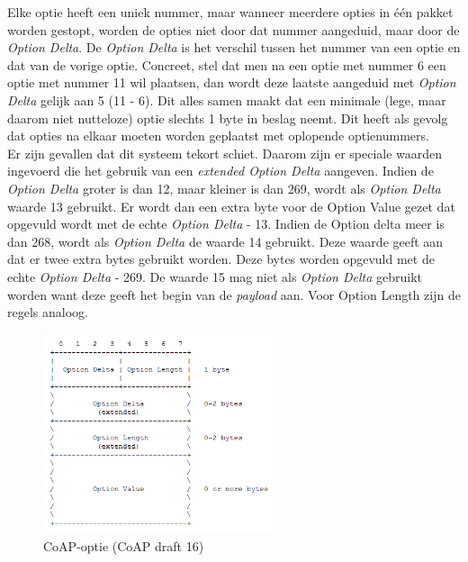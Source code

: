 Elke optie heeft een uniek nummer, maar wanneer meerdere opties in \'{e}\'{e}n pakket worden gestopt, worden de opties niet door dat nummer aangeduid, maar door de \textit{Option Delta}. De \textit{Option Delta} is het verschil tussen het nummer van een optie en dat van de vorige optie.
Concreet, stel dat men na een optie met nummer 6 een optie met nummer 11 wil plaatsen, dan wordt deze laatste aangeduid met \textit{Option Delta} gelijk aan 5 (11 - 6). Dit alles samen maakt dat een minimale (lege, maar daarom niet nutteloze) optie slechts 1 byte in beslag neemt. Dit heeft als gevolg dat opties na elkaar moeten worden geplaatst met oplopende optienummers.\\

Er zijn gevallen dat dit systeem tekort schiet. Daarom zijn er speciale waarden ingevoerd die het gebruik van een \textit{extended Option Delta} aangeven. Indien de \textit{Option Delta} groter is dan 12, maar kleiner is dan 269, wordt als \textit{Option Delta} waarde 13 gebruikt. Er wordt dan een extra byte voor de Option Value gezet dat opgevuld wordt met de echte \textit{Option Delta} - 13. Indien de Option delta meer is dan 268, wordt als \textit{Option Delta} de waarde 14 gebruikt. Deze waarde geeft aan dat er twee extra bytes gebruikt worden. Deze bytes worden opgevuld met de echte \textit{Option Delta} - 269. De waarde 15 mag niet als \textit{Option Delta} gebruikt worden want deze geeft het begin van de \textit{payload} aan. Voor Option Length zijn de regels analoog.


\begin{figure}[h]
\centering
\includegraphics[width=0.6\textwidth]{fig/CoAPOpties}
\vspace{-10pt}
\caption{CoAP-optie (CoAP draft 16)}
\label{fig:CoAPOpties}
\end{figure}


